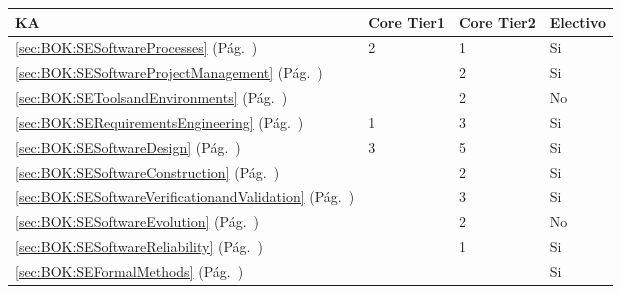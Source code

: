 \begin{center}
\begin{tabularx}{\textwidth}{|X|p{1cm}|p{1cm}|p{1.4cm}|}\hline
\textbf{\acf{KA}} & \textbf{Core Tier1} & \textbf{Core Tier2} & \textbf{Electivo} \\ \hline
\ref{sec:BOK:SESoftwareProcesses} \htmlref{\SESoftwareProcesses}{sec:BOK:SESoftwareProcesses}\xspace (Pág.~\pageref{sec:BOK:SESoftwareProcesses}) & 2 & 1 & Si \\ \hline
\ref{sec:BOK:SESoftwareProjectManagement} \htmlref{\SESoftwareProjectManagement}{sec:BOK:SESoftwareProjectManagement}\xspace (Pág.~\pageref{sec:BOK:SESoftwareProjectManagement}) & ~ & 2 & Si \\ \hline
\ref{sec:BOK:SEToolsandEnvironments} \htmlref{\SEToolsandEnvironments}{sec:BOK:SEToolsandEnvironments}\xspace (Pág.~\pageref{sec:BOK:SEToolsandEnvironments}) & ~ & 2 & No \\ \hline
\ref{sec:BOK:SERequirementsEngineering} \htmlref{\SERequirementsEngineering}{sec:BOK:SERequirementsEngineering}\xspace (Pág.~\pageref{sec:BOK:SERequirementsEngineering}) & 1 & 3 & Si \\ \hline
\ref{sec:BOK:SESoftwareDesign} \htmlref{\SESoftwareDesign}{sec:BOK:SESoftwareDesign}\xspace (Pág.~\pageref{sec:BOK:SESoftwareDesign}) & 3 & 5 & Si \\ \hline
\ref{sec:BOK:SESoftwareConstruction} \htmlref{\SESoftwareConstruction}{sec:BOK:SESoftwareConstruction}\xspace (Pág.~\pageref{sec:BOK:SESoftwareConstruction}) & ~ & 2 & Si \\ \hline
\ref{sec:BOK:SESoftwareVerificationandValidation} \htmlref{\SESoftwareVerificationandValidation}{sec:BOK:SESoftwareVerificationandValidation}\xspace (Pág.~\pageref{sec:BOK:SESoftwareVerificationandValidation}) & ~ & 3 & Si \\ \hline
\ref{sec:BOK:SESoftwareEvolution} \htmlref{\SESoftwareEvolution}{sec:BOK:SESoftwareEvolution}\xspace (Pág.~\pageref{sec:BOK:SESoftwareEvolution}) & ~ & 2 & No \\ \hline
\ref{sec:BOK:SESoftwareReliability} \htmlref{\SESoftwareReliability}{sec:BOK:SESoftwareReliability}\xspace (Pág.~\pageref{sec:BOK:SESoftwareReliability}) & ~ & 1 & Si \\ \hline
\ref{sec:BOK:SEFormalMethods} \htmlref{\SEFormalMethods}{sec:BOK:SEFormalMethods}\xspace (Pág.~\pageref{sec:BOK:SEFormalMethods}) & ~ & ~ & Si \\ \hline
\end{tabularx}
\end{center}
